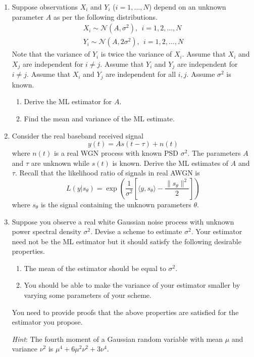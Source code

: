 \documentclass[10pt]{report}
\begin{document}
\begin{enumerate}
  \item Suppose observations $X_i$ and $Y_i$ ($i=1,\ldots,N$) depend on an unknown parameter $A$ as per the following distributions.
    \begin{eqnarray*}
      X_i \sim  \mathcal{N}(A,\sigma^2) , \ \ i = 1,2,\ldots,N\\
      Y_i \sim  \mathcal{N}(A,2\sigma^2) , \ \ i = 1,2,\ldots,N
    \end{eqnarray*}
  Note that the variance of $Y_i$ is twice the variance of $X_i$. Assume that $X_i$ and $X_j$ are independent for $i \neq j$. Assume that $Y_i$ and $Y_j$ are independent for $i \neq j$. Assume that $X_i$ and $Y_j$ are independent for all $i,j$. Assume $\sigma^2$ is known.
    \begin{enumerate}
      \item Derive the ML estimator for $A$.
      \item Find the mean and variance of the ML estimate.
    \end{enumerate}
  \item Consider the real baseband received signal 
  \begin{equation*}
    y(t) = As(t-\tau) + n(t)
  \end{equation*}
where $n(t)$ is a real WGN process with known PSD $\sigma^2$. The parameters $A$ and $\tau$ are unknown while $s(t)$ is known. Derive the ML estimates of $A$ and $\tau$. Recall that the likelihood ratio of signals in real AWGN is
      \begin{equation*}
        L(y|s_\theta) = \exp\left( \frac{1}{\sigma^2} \left[\langle y, s_\theta\rangle - \frac{\lVert s_\theta \rVert^2}{2} \right]\right)
      \end{equation*}
      where $s_\theta$ is the signal containing the unknown parameters $\theta$.

  \item Suppose you observe a real white Gaussian noise process with unknown power spectral density $\sigma^2$. Devise a scheme to estimate $\sigma^2$. Your estimator need not be the ML estimator but it should satisfy the following desirable properties.
  \begin{enumerate}
    \item The mean of the estimator should be equal to $\sigma^2$. 
    \item You should be able to make the variance of your estimator smaller by varying some parameters of your scheme.
  \end{enumerate}
  You need to provide proofs that the above properties are satisfied for the estimator you propose. 

 \textit{Hint}: The fourth moment of a Gaussian random variable with mean $\mu$ and variance $\nu^2$ is $\mu^4 + 6\mu^2\nu^2 + 3\nu^4$.\end{enumerate}
\end{document}
